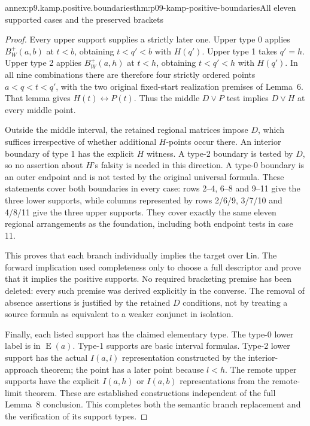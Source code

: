 \begin{annexitem}{annex:p9.kamp.positive.boundaries}{thm:p09-kamp-positive-boundaries}{All eleven supported cases and the preserved brackets}
\begin{proof}
Every upper support supplies a strictly later one. Upper type 0
applies \(B_W^+(a,b)\) at \(t<b\), obtaining
\(t<q'<b\) with \(H(q')\). Upper type 1 takes
\(q'=h\). Upper type 2 applies \(B_W^+(a,h)\) at
\(t<h\), obtaining \(t<q'<h\) with \(H(q')\).
In all nine combinations there are therefore four strictly ordered
points \(a<q<t<q'\), with the two original fixed-start
realization premises of Lemma~6. That lemma gives
\(H(t)\longleftrightarrow P(t)\).
Thus the middle \(D\lor P\) test implies \(D\lor H\)
at every middle point.

Outside the middle interval, the retained regional matrices impose
\(D\), which suffices irrespective of whether additional
\(H\)-points occur there. An interior boundary of type 1
has the explicit \(H\) witness. A type-2 boundary is tested
by \(D\), so no assertion about \(H\)'s falsity is needed
in this direction. A type-0 boundary is an outer endpoint and
is not tested by the original universal formula. These statements
cover both boundaries in every case: rows 2--4, 6--8 and 9--11
give the three lower supports, while columns represented by rows
2/6/9, 3/7/10 and 4/8/11 give the three upper supports.
They cover exactly the same eleven regional arrangements as the
foundation, including both endpoint tests in case 11.

This proves that each branch individually implies the target over
\(\mathsf{Lin}\). The forward implication used completeness
only to choose a full descriptor and prove that it implies the
positive supports. No required bracketing premise has been deleted:
every such premise was derived explicitly in the converse.
The removal of absence assertions is justified by the retained
\(D\) conditions, not by treating a source formula as equivalent
to a weaker conjunct in isolation.

Finally, each listed support has the claimed elementary type.
The type-0 lower label is in \(\operatorname{E}(a)\).
Type-1 supports are basic interval formulas. Type-2 lower support
has the actual \(I(a,l)\) representation constructed by
the interior-approach theorem; the point has a later point because
\(l<h\). The remote upper supports have the explicit
\(I(a,h)\) or \(I(a,b)\) representations from the remote-limit
theorem. These are established constructions independent of the
full Lemma~8 conclusion. This completes both the semantic branch
replacement and the verification of its support types.
\end{proof}
\end{annexitem}

